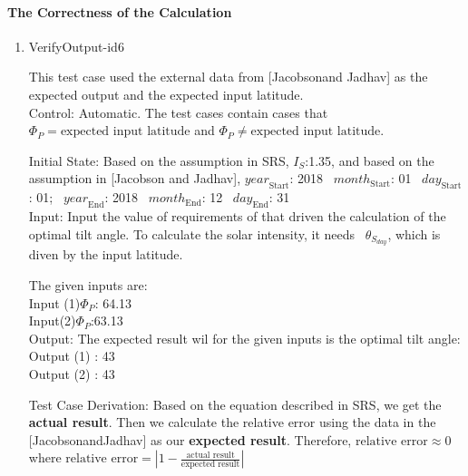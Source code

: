 \documentclass[12pt, titlepage]{article}
\begin{document}
\paragraph{The Correctness of the Calculation}
\begin{enumerate}




\item{VerifyOutput-id6\\} 

This test case used the external data from [Jacobsonand
Jadhav\cite{JacobsonandJadhav}] as the expected output and the expected
input latitude.\\ 

Control: Automatic. The test cases contain cases that $\Phi_P
= \text{expected input latitude}$ and $\Phi_P \ne \text{expected input
latitude}$. 

Initial State: Based on the assumption in SRS\cite{YS2019}, $I_{S}$:1.35, and
based on the assumption in [Jacobson and Jadhav\cite{JacobsonandJadhav}],
$\mathit{year}_\text{Start}$: 2018
~$\mathit{month}_\text{Start}$: 01 
~$\mathit{day}_\text{Start}$: 01;
~$\mathit{year}_\text{End}$: 2018 
~$\mathit{month}_\text{End}$: 12
~$\mathit{day}_\text{End}$: 31\\ 

Input: Input the value of requirements of
\progname that driven the calculation of the optimal tilt angle. To calculate
the solar intensity, it needs ~$\theta_{S_{day}}$, which is diven by the input
latitude. 

The given inputs are:\\
 Input (1)$\Phi_P$: 64.13 \\ 
Input(2)$\Phi_P$:63.13\\

Output: The expected result wil for the given inputs is the optimal tilt
angle:\\ Output (1) : 43\\ Output (2) : 43\\


Test Case Derivation: Based on the equation described in SRS\cite{YS2019}, we
get the \textbf{actual result}. Then we calculate the relative error using the
data in the
 [JacobsonandJadhav\cite{JacobsonandJadhav}] as our \textbf{expected result}. 
Therefore, $\text{relative error} \approx 0$ where $\text{relative error} =
 | 1 - \frac{\text{actual result}}{ \text{expected result}} |$ 


\end{enumerate}
\end{document}
